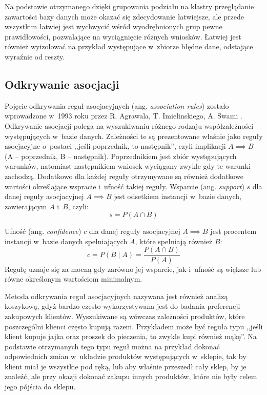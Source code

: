 \documentclass[a4paper,twoside,12pt]{book}
\newcommand{\obcy}[1]{\emph{#1}}
\renewcommand{\ang}[1]{{\selectlanguage{british}\obcy{#1}}}
\begin{document}
Na podstawie otrzymanego dzięki grupowania podziału na klastry przeglądanie zawartości bazy danych może okazać się zdecydowanie łatwiejsze, ale przede wszystkim łatwiej jest wychwycić wśród wyodrębnionych grup pewne prawidłowości, pozwalające na wyciągnięcie różnych wniosków. Łatwiej jest również wyizolować na przykład występujące w~zbiorze błędne dane, odstające wyraźnie od reszty.

\subsection{Odkrywanie asocjacji}
Pojęcie odkrywania reguł asocjacyjnych (ang. \ang{association rules}) zostało wprowadzone w~1993 roku przez R. Agrawala, T. Imielinskiego, A. Swami \cite{bib:associationrules}. Odkrywanie asocjacji polega na wyszukiwaniu różnego rodzaju współzależności występujących w~bazie danych. Zależności te są prezentowane właśnie jako reguły asocjacyjne o~postaci ,,jeśli poprzednik, to następnik'', czyli implikacji \(A \implies B\) (A -- poprzednik, B -- następnik). Poprzednikiem jest zbiór występujących warunków, natomiast następnikiem wniosek wyciągany zwykle gdy te warunki zachodzą. Dodatkowo dla każdej reguły otrzymywane są również dodatkowe wartości określające wspracie i~ufność takiej reguły. Wsparcie (ang. \ang{support}) $s$ dla danej reguły asocjacyjnej \(A \implies B\) jest odsetkiem instancji w~bazie danych, zawierającym $A$ i~$B$, czyli:
\begin{equation}
s = P(A \cap B)
\end{equation}

Ufność (ang. \ang{confidence}) $c$  dla danej reguły asocjacyjnej \(A \implies B\) jest procentem instancji w~bazie danych spełniających $A$, które spełniają również $B$:
\begin{equation}
c = P(B \mid A) = \frac{P(A \cap B)}{P(A)}
\end{equation}
Regułę uznaje się za mocną gdy zarówno jej wsparcie, jak i~ufność są większe lub równe określonym wartościom minimalnym.

Metoda odkrywania reguł asocjacyjnych nazywana jest również analizą koszykową, gdyż bardzo często wykorzystywana jest do badania preferencji zakupowych klientów. Wyszukiwane są wówczas zależności produktów, które poszczególni klienci często kupują razem. Przykładem może być reguła typu ,,jeśli klient kupuje jajka oraz proszek do pieczenia, to zwykle kupi również mąkę''. Na podstawie otrzymanych tego typu reguł można na przykład dokonać odpowiednich zmian w~układzie produktów występujących w~sklepie, tak by klient miał je wszystkie pod ręką, lub aby właśnie przeszedł cały sklep, by je znaleźć, ale przy okazji dokonać zakupu innych produktów, które nie były celem jego pójścia do sklepu.
\end{document}
